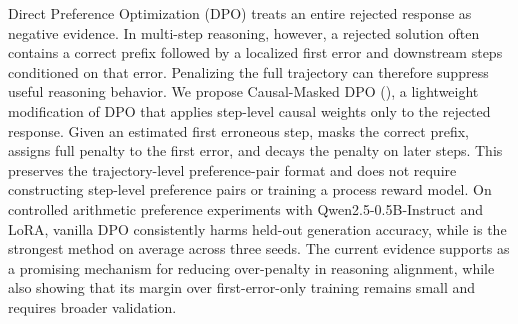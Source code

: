Direct Preference Optimization (DPO) treats an entire rejected response as negative evidence. In multi-step reasoning, however, a rejected solution often contains a correct prefix followed by a localized first error and downstream steps conditioned on that error. Penalizing the full trajectory can therefore suppress useful reasoning behavior. We propose Causal-Masked DPO (\cmdpo), a lightweight modification of DPO that applies step-level causal weights only to the rejected response. Given an estimated first erroneous step, \cmdpo masks the correct prefix, assigns full penalty to the first error, and decays the penalty on later steps. This preserves the trajectory-level preference-pair format and does not require constructing step-level preference pairs or training a process reward model. On controlled arithmetic preference experiments with Qwen2.5-0.5B-Instruct and LoRA, vanilla DPO consistently harms held-out generation accuracy, while \cmdpo is the strongest method on average across three seeds. The current evidence supports \cmdpo as a promising mechanism for reducing over-penalty in reasoning alignment, while also showing that its margin over first-error-only training remains small and requires broader validation.
